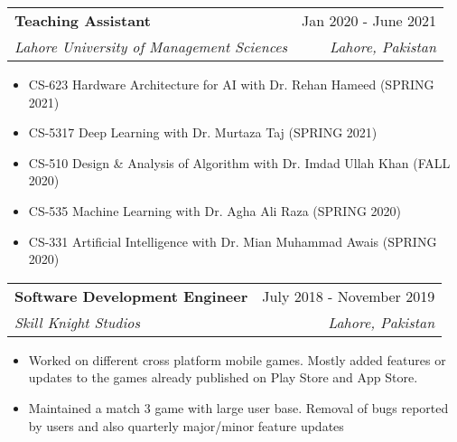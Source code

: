 \documentclass[letterpaper,11pt]{article}
\makeatletter
\newcommand{\resumeItem}[1]{
  \item\small{
    {#1 \vspace{-2pt}}
  }
}
\newcommand{\resumeSubheading}[4]{
  \vspace{-2pt}\item
    \begin{tabular*}{0.97\textwidth}[t]{l@{\extracolsep{\fill}}r}
      \textbf{#1} & #2 \\
      \textit{\small#3} & \textit{\small #4} \\
    \end{tabular*}\vspace{-7pt}
}
\newcommand{\resumeSubSubheading}[2]{
    \item
    \begin{tabular*}{0.97\textwidth}{l@{\extracolsep{\fill}}r}
      \textit{\small#1} & \textit{\small #2} \\
    \end{tabular*}\vspace{-7pt}
}
\newcommand{\resumeSubHeadingListEnd}{\end{itemize}}
\newcommand{\resumeItemListStart}{\begin{itemize}}
\newcommand{\resumeItemListEnd}{\end{itemize}\vspace{-5pt}}
\makeatother
\begin{document}
    \resumeSubheading
      {Teaching Assistant}{Jan 2020 - June 2021}
      {Lahore University of Management Sciences}{Lahore, Pakistan}
      \vspace{0.1cm}
      
      \resumeItemListStart
      Designed and graded assignments/quizzes for the following courses:
        \resumeItem{CS-623 Hardware Architecture for AI with Dr. Rehan Hameed (SPRING 2021)}
        \resumeItem{CS-5317 Deep Learning with Dr. Murtaza Taj (SPRING 2021)}
        \resumeItem{CS-510 Design \& Analysis of Algorithm with Dr. Imdad Ullah Khan (FALL 2020)}
        \resumeItem{CS-535 Machine Learning with Dr. Agha Ali Raza (SPRING 2020)}
        \resumeItem{CS-331 Artificial Intelligence with Dr. Mian Muhammad Awais (SPRING 2020)}        
     \resumeItemListEnd      
      
      
    \resumeSubheading
      {Software Development Engineer}{July 2018 - November 2019}
      {Skill Knight Studios}{Lahore, Pakistan}
      \resumeItemListStart
        \resumeItem{Worked on different cross platform mobile games. Mostly added features or updates to the games already published on Play Store and App Store.}
        \resumeItem{Maintained a match 3 game with large user base. Removal of bugs reported by users and also quarterly major/minor feature updates}
\resumeItemListEnd
    


      


\end{document}
